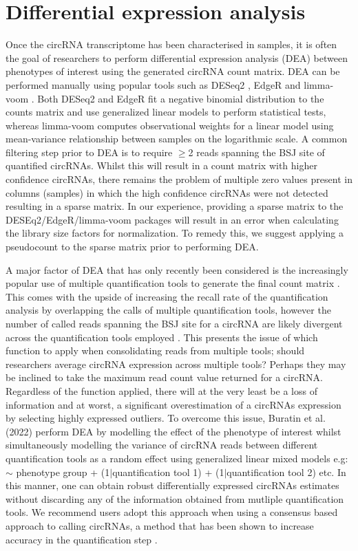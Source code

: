 \documentclass[pdflatex,sn-mathphys-num]{sn-jnl}
\begin{document}
\section{Differential expression analysis}
Once the circRNA transcriptome has been characterised in samples, it is often the goal of researchers to perform differential expression analysis (DEA) between phenotypes of interest using the generated circRNA count matrix. DEA can be performed manually using popular tools such as DESeq2 \cite{Love2014Dec}, EdgeR \cite{Robinson2010Jan} and limma-voom \cite{Law2014Feb}. Both DESeq2 and EdgeR fit a negative binomial distribution to the counts matrix and use generalized linear models to perform statistical tests, whereas limma-voom computes observational weights for a linear model using mean-variance relationship between samples on the logarithmic scale. A common filtering step prior to DEA is to require $\geq$2 reads spanning the BSJ site of quantified circRNAs. Whilst this will result in a count matrix with higher confidence circRNAs, there remains the problem of multiple zero values present in columns (samples) in which the high confidence circRNAs were not detected resulting in a sparse matrix. In our experience, providing a sparse matrix to the DESEq2/EdgeR/limma-voom packages will result in an error when calculating the library size factors for normalization. To remedy this, we suggest applying a pseudocount to the sparse matrix prior to performing DEA. \par
A major factor of DEA that has only recently been considered is the increasingly popular use of multiple quantification tools to generate the final count matrix \cite{Hansen2018, CirComPara2, Digby2023Dec}. This comes with the upside of increasing the recall rate of the quantification analysis by overlapping the calls of multiple quantification tools, however the number of called reads spanning the BSJ site for a circRNA are likely divergent across the quantification tools employed \cite{Hansen2016Apr,Hansen2018}. This presents the issue of which function to apply when consolidating reads from multiple tools; should researchers average circRNA expression across multiple tools? Perhaps they may be inclined to take the maximum read count value returned for a circRNA. Regardless of the function applied, there will at the very least be a loss of information and at worst, a significant overestimation of a circRNAs expression by selecting highly expressed outliers. To overcome this issue, Buratin et al. (2022) \cite{Buratin2022} perform DEA by modelling the effect of the phenotype of interest whilst simultaneously modelling the variance of circRNA reads between different quantification tools as a random effect using generalized linear mixed models e.g: $\sim$ phenotype group + (1$\vert$quantification tool 1) + (1$\vert$quantification tool 2) etc. In this manner, one can obtain robust differentially expressed circRNAs estimates without discarding any of the information obtained from mutliple quantification tools. We recommend users adopt this approach when using a consensus based approach to calling circRNAs, a method that has been shown to increase accuracy in the quantification step \cite{Hansen2018}. \par
\end{document}
